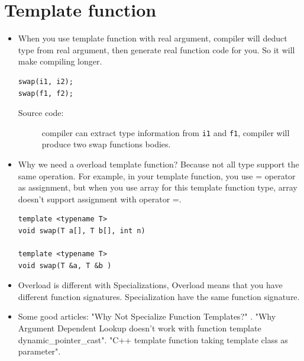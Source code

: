 \documentclass[a4paper,11pt,twoside]{book}
\begin{document}
\section{Template function}
\begin{itemize}
	\item When you use template function with real argument, compiler will deduct type from real argument, then generate real function code for you.  So it will make compiling longer.
	
\begin{lstlisting}[numbers=none]
swap(i1, i2);
swap(f1, f2);
\end{lstlisting}
\begin{description}
	\item[Source code:] compiler can extract type information from \texttt{i1} and \texttt{f1}, compiler will produce two swap functions bodies.
\end{description}

	\item Why we need a overload template function? Because not all type support the same operation. For example, in your template function, you use = operator as assignment, but when you use array for this template function type, array doesn't support assignment with operator =.
\begin{lstlisting}[numbers=none]
template <typename T>
void swap(T a[], T b[], int n)

template <typename T>
void swap(T &a, T &b )
\end{lstlisting}

\item Overload is different with Specializations, Overload means that you have different function signatures. Specialization have the same function signature.

\item Some good articles:\newline
"Why Not Specialize Function Templates?" .
\newline
"Why Argument Dependent Lookup doesn't work with function template dynamic\_pointer\_cast". 
\newline
"C++ template function taking template class as parameter".
\end{itemize}
\end{document}
